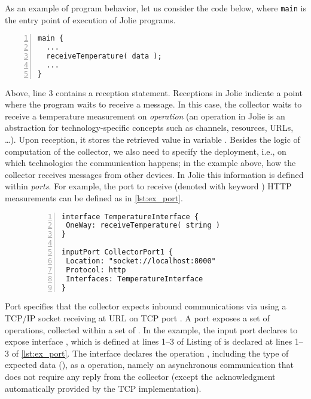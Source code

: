 As an example of program behavior, let us consider the code below, where \lstinline{main} is the entry point of execution of Jolie programs.
%
\begin{lstlisting}[numbers=left,basicstyle=\footnotesize\ttfamily]
main {
  ...
  receiveTemperature( data );
  ...
}
\end{lstlisting}
%
Above, line 3 contains a reception statement.
Receptions in Jolie indicate a
point where the program waits to receive a message.
In this case, the collector
waits to receive a temperature measurement on \emph{operation}
 (an operation in Jolie is an abstraction for
technology-specific concepts such as channels, resources, URLs,
\dots). Upon reception, it stores the retrieved value in variable .
%
Besides the logic of computation of the collector, we also need to specify the deployment, i.e., on
which technologies the communication happens; in the example above, how the
collector receives messages from other devices. In Jolie this information is
defined within \emph{ports}. For example, the port to receive (denoted with
keyword ) HTTP measurements can be defined as in \cref{lst:ex_port}.
%
\begin{figure}
\begin{lstlisting}[numbers=left,basicstyle=\ttfamily\footnotesize,caption=Example of interface
and input port in Jolie.,label=lst:ex_port]
interface TemperatureInterface {
 OneWay: receiveTemperature( string )
}

inputPort CollectorPort1 {
 Location: "socket://localhost:8000"
 Protocol: http
 Interfaces: TemperatureInterface
}
\end{lstlisting}
\end{figure}
%
Port  specifies that the collector expects inbound
communications via   using a TCP/IP socket receiving
at URL  on TCP port . A port exposes a set of operations, collected within a set of . In the example, the input port  declares to expose interface , which is defined at lines 1--3 of Listing of  is declared at lines 1--3 of \cref{lst:ex_port}. The interface declares the operation
, including the type of expected data
(), as a  operation, namely an asynchronous
communication that does not require any reply from the collector (except the
acknowledgment automatically provided by the TCP implementation).

